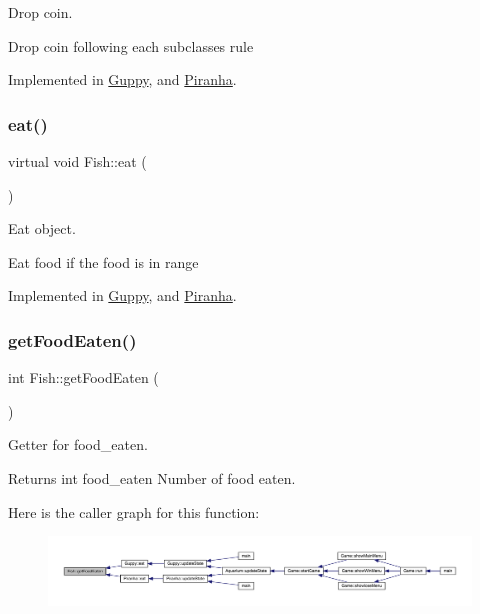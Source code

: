 Drop coin. 

Drop coin following each subclasses rule 

Implemented in \mbox{\hyperlink{class_guppy_a356d1f45f52684bba3e6e9e7774e59b8}{Guppy}}, and \mbox{\hyperlink{class_piranha_aee107987f36631002f04c5283564382b}{Piranha}}.

\mbox{\label{class_fish_af209980bd39b8de9b4bb38b7ad4edd04}} 
\subsubsection{\texorpdfstring{eat()}{eat()}}
{\footnotesize\ttfamily virtual void Fish\+::eat (\begin{DoxyParamCaption}{ }\end{DoxyParamCaption})\hspace{0.3cm}{\ttfamily [pure virtual]}}



Eat object. 

Eat food if the food is in range 

Implemented in \mbox{\hyperlink{class_guppy_afe934262a0988e4ad041f4ed3a1a7e02}{Guppy}}, and \mbox{\hyperlink{class_piranha_ac48c0256edd56c427b3d82f6e0d4df82}{Piranha}}.

\mbox{\label{class_fish_a5ff6258ba2d031b4cc815e8318bea135}} 
\subsubsection{\texorpdfstring{get\+Food\+Eaten()}{getFoodEaten()}}
{\footnotesize\ttfamily int Fish\+::get\+Food\+Eaten (\begin{DoxyParamCaption}{ }\end{DoxyParamCaption})}



Getter for food\+\_\+eaten. 

\begin{DoxyReturn}{Returns}
int food\+\_\+eaten Number of food eaten. 
\end{DoxyReturn}
Here is the caller graph for this function\+:
\nopagebreak
\begin{figure}[H]
\begin{center}
\leavevmode
\includegraphics[width=350pt]{class_fish_a5ff6258ba2d031b4cc815e8318bea135_icgraph}
\end{center}
\end{figure}
\mbox{\label{class_fish_aa4f43ec5e63aff8a1db32d530a91652d}} 
